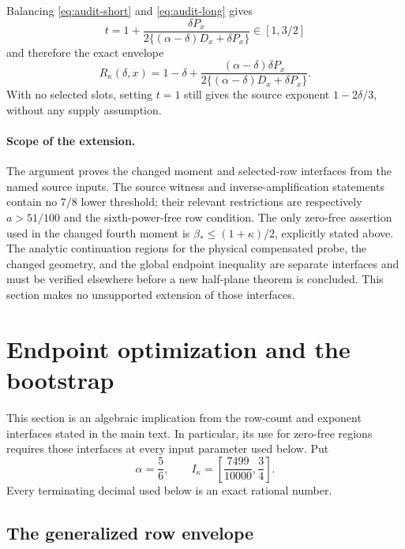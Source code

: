 \documentclass[11pt,a4paper]{article}
\numberwithin{equation}{section}
\theoremstyle{remark}
\begin{document}
Balancing \eqref{eq:audit-short} and \eqref{eq:audit-long} gives
\begin{equation}\label{eq:audit-optimal-t}
 t=1+\frac{\delta P_x}
          {2\{(\alpha-\delta)D_x+\delta P_x\}}\in[1,3/2]
\end{equation}
and therefore the exact envelope
\begin{equation}\label{eq:audit-Rstar}
 R_\kappa(\delta,x)=1-\delta+
 \frac{(\alpha-\delta)\delta P_x}
      {2\{(\alpha-\delta)D_x+\delta P_x\}}.
\end{equation}
With no selected slots, setting $t=1$ still gives the source exponent
$1-2\delta/3$, without any supply assumption.

\paragraph{Scope of the extension.}
The argument proves the changed moment and selected-row interfaces from
the named source inputs.  The source witness and inverse-amplification
statements contain no $7/8$ lower threshold; their relevant restrictions
are respectively $a>51/100$ and the sixth-power-free row condition.
The only zero-free assertion used in the changed fourth moment is
$\beta_*\le(1+\kappa)/2$, explicitly stated above.
The analytic continuation regions for the physical compensated probe,
the changed geometry, and the global endpoint inequality are separate
interfaces and must be verified elsewhere before a new half-plane
theorem is concluded.  This section makes no unsupported extension of
those interfaces.



\section{Endpoint optimization and the bootstrap}
\label{sec:algebra-audit}

This section is an algebraic implication from the row-count and exponent
interfaces stated in the main text.  In particular, its use for zero-free
regions requires those interfaces at every input parameter used below.
Put
\[
 \alpha=\frac56,\qquad
 I_\kappa=\left[\frac{7499}{10000},\frac34\right].
\]
Every terminating decimal used below is an exact rational number.

\subsection{The generalized row envelope}
\end{document}

